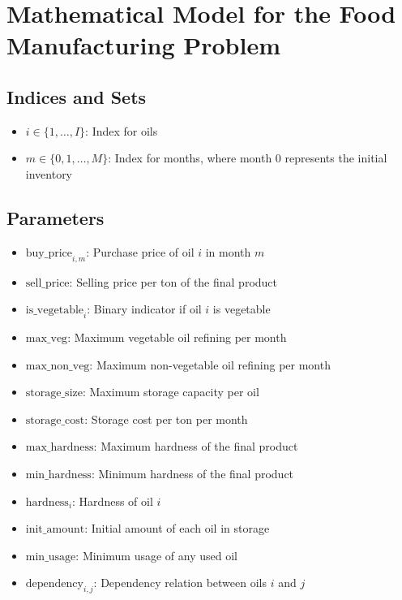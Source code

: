 \documentclass{article}
\begin{document}
\section*{Mathematical Model for the Food Manufacturing Problem}

\subsection*{Indices and Sets}
\begin{itemize}
    \item $i \in \{1, \ldots, I\}$: Index for oils
    \item $m \in \{0, 1, \ldots, M\}$: Index for months, where month 0 represents the initial inventory
\end{itemize}

\subsection*{Parameters}
\begin{itemize}
    \item $\text{buy\_price}_{i, m}$: Purchase price of oil $i$ in month $m$
    \item $\text{sell\_price}$: Selling price per ton of the final product
    \item $\text{is\_vegetable}_i$: Binary indicator if oil $i$ is vegetable
    \item $\text{max\_veg}$: Maximum vegetable oil refining per month
    \item $\text{max\_non\_veg}$: Maximum non-vegetable oil refining per month
    \item $\text{storage\_size}$: Maximum storage capacity per oil
    \item $\text{storage\_cost}$: Storage cost per ton per month
    \item $\text{max\_hardness}$: Maximum hardness of the final product
    \item $\text{min\_hardness}$: Minimum hardness of the final product
    \item $\text{hardness}_i$: Hardness of oil $i$
    \item $\text{init\_amount}$: Initial amount of each oil in storage
    \item $\text{min\_usage}$: Minimum usage of any used oil
    \item $\text{dependency}_{i,j}$: Dependency relation between oils $i$ and $j$
\end{itemize}
\end{document}
